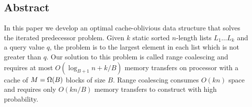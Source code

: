 \subsection*{Abstract}
In this paper we develop an optimal cache-oblivious data structure that solves the
iterated predecessor problem. Given $k$ static sorted $n$-length lists $L_1 \ldots L_k$
and a query value $q$, the  problem is to the largest
element in each list which is not greater than $q$.  Our solution to this problem
is called range coalescing and requires at most $O(\log_{B+1} n + k/B)$ memory
transfers on processor with a cache of $M = \Omega \mathopen{}\left(B\right)\mathclose{}$ blocks of size $B$.
Range coalescing consumes $O(kn)$ space and requires only $O(kn/B)$ memory transfers
to construct with high probability.